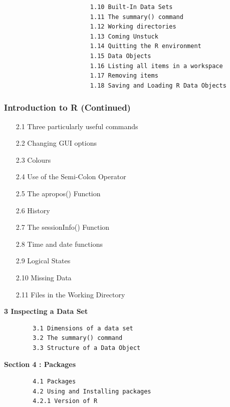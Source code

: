 \documentclass{beamer}
\begin{document}
 		 	 	\begin{frame}[fragile]
 		 	 		\begin{framed}
 		 	 			\begin{verbatim}
 		 	 			1.10 Built-In Data Sets      
 		 	 			1.11 The summary() command     
 		 	 			1.12 Working directories      
 		 	 			1.13 Coming Unstuck    
 		 	 			1.14 Quitting the R environment   
 		 	 			1.15 Data Objects  
 		 	 			1.16 Listing all items in a workspace     
 		 	 			1.17 Removing items   
 		 	 			1.18 Saving and Loading R Data Objects    
 		 	 			\end{verbatim}
 		 	 		\end{framed}
 		 	 	\end{frame}

 	\begin{frame}
 		\frametitle{Introduction to R (Continued) }
 		\begin{itemize}
 			\item[2.1] Three particularly useful commands    
 			\item[2.2] Changing GUI options     
 			\item[2.3] Colours      
 			\item[2.4] Use of the Semi-Colon Operator     
 			\item[2.5] The apropos() Function     
 			\item[2.6] History       
 			\item[2.7] The sessionInfo() Function     
 			\item[2.8] Time and date functions     
 			\item[2.9] Logical States      
 			\item[2.10] Missing Data      
 			\item[2.11] Files in the Working Directory     
 		\end{itemize}
 	\end{frame}

 	\begin{frame}[fragile]
 		
 		\textbf{3 Inspecting a Data Set }
 		\begin{verbatim}
 		3.1 Dimensions of a data set 
 		3.2 The summary() command 		
 		3.3 Structure of a Data Object 
 		\end{verbatim}
 	\end{frame}
 	\begin{frame}[fragile]
 		\textbf{Section 4 : Packages}
 		\begin{verbatim}
 		4.1 Packages 
 		4.2 Using and Installing packages 
 		4.2.1 Version of R 
 		\end{verbatim}
 	\end{frame}
\end{document}
